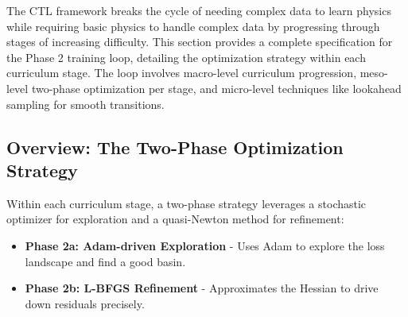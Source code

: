 \documentclass{article}
\begin{document}
The CTL framework breaks the cycle of needing complex data to learn physics while requiring basic physics to handle complex data by progressing through stages of increasing difficulty. This section provides a complete specification for the Phase 2 training loop, detailing the optimization strategy within each curriculum stage. The loop involves macro-level curriculum progression, meso-level two-phase optimization per stage, and micro-level techniques like lookahead sampling for smooth transitions.

\subsection{Overview: The Two-Phase Optimization Strategy}

Within each curriculum stage, a two-phase strategy leverages a stochastic optimizer for exploration and a quasi-Newton method for refinement:

\begin{itemize}
    \item \textbf{Phase 2a: Adam-driven Exploration} - Uses Adam to explore the loss landscape and find a good basin.
    \item \textbf{Phase 2b: L-BFGS Refinement} - Approximates the Hessian to drive down residuals precisely.
\end{itemize}
\end{document}
